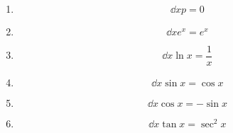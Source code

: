 \begin{enumerate}[label=]
	\item \begin{equation*}
	\dd{x} p = 0
	\end{equation*}
	\item \begin{equation*}
	\dd{x} e^x = e^x
	\end{equation*}
	\item \begin{equation*}
	\dd{x} \ln{x} = \frac{1}{x}
	\end{equation*}
	\item \begin{equation*}
	\dd{x} \sin{x} = \cos{x}
	\end{equation*}
	\item \begin{equation*}
	\dd{x} \cos{x} = -\sin{x}
	\end{equation*}
	\item \begin{equation*}
	\dd{x} \tan{x} = \sec^2{x}
	\end{equation*}
\end{enumerate}
